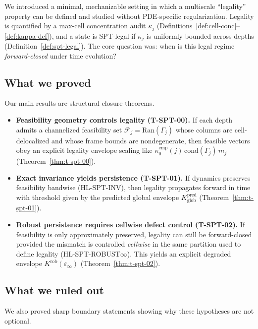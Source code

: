 \documentclass[11pt]{article}
\newcommand{\Ran}{\mathrm{Ran}}
\begin{document}
We introduced a minimal, mechanizable setting in which a multiscale ``legality'' property can be defined and studied without PDE-specific regularization.
Legality is quantified by a max-cell concentration audit $\kappa_j$ (Definitions~\ref{def:cell-conc}--\ref{def:kappa-def}), and a state is SPT-legal if $\kappa_j$ is uniformly bounded across depths (Definition~\ref{def:spt-legal}).
The core question was: when is this legal regime \emph{forward-closed} under time evolution?

\subsection{What we proved}

Our main results are structural closure theorems.

\begin{itemize}
\item \textbf{Feasibility geometry controls legality (T-SPT-00).}
If each depth admits a channelized feasibility set $\mathcal{F}_j=\Ran(\Gamma_j)$ whose columns are cell-delocalized and whose frame bounds are nondegenerate, then feasible vectors obey an explicit legality envelope scaling like
$\kappa^{\mathrm{emp}}_0(j)\,\mathrm{cond}(\Gamma_j)\,m_j$
(Theorem~\ref{thm:t-spt-00}).

\item \textbf{Exact invariance yields persistence (T-SPT-01).}
If dynamics preserves feasibility bandwise (HL-SPT-INV), then legality propagates forward in time with threshold given by the predicted global envelope $K^{\mathrm{pred}}_{\mathrm{glob}}$
(Theorem~\ref{thm:t-spt-01}).

\item \textbf{Robust persistence requires cellwise defect control (T-SPT-02).}
If feasibility is only approximately preserved, legality can still be forward-closed provided the mismatch is controlled \emph{cellwise} in the same partition used to define legality (HL-SPT-ROBUST$\infty$).
This yields an explicit degraded envelope $K^{\mathrm{rob}}(\varepsilon_\infty)$
(Theorem~\ref{thm:t-spt-02}).
\end{itemize}

\subsection{What we ruled out}

We also proved sharp boundary statements showing why these hypotheses are not optional.
\end{document}
